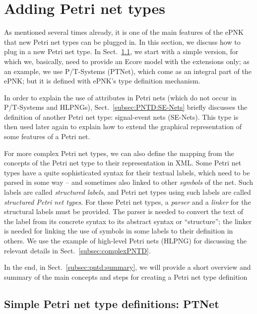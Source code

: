 \section{Adding Petri net types}  
\label{sec:adding-types}

As mentioned several times already, it is one of the main features of the ePNK
that new Petri net types can be plugged in. In this section, we discuss how to
plug in a new Petri net type.  In Sect.~\ref{subsec:simplePNTD}, we start with a
simple version, for which we, basically, need to provide an Ecore model with
the extensions only; as an example, we use P/T-Systems (PTNet), which come as an
integral part of the ePNK; but it is defined with ePNK's type definition
mechanism.

In order to explain the use of attributes in Petri nets (which do not occur
in P/T-Systems and HLPNGs), Sect.~\ref{subsec:PNTD:SE-Nets} briefly discusses
the definition of another Petri net type: signal-event nets (SE-Nets). This type is
then used later again to explain how to extend the graphical representation of
some features of a Petri net.

For more complex Petri net types, we can also define the mapping from the
concepts of the Petri net type to their representation in XML. Some Petri
net types have a quite sophisticated syntax for their textual labels,
which need to be parsed in some way -- and sometimes also linked to
other \emph{symbols} of the net. Such labels are called \emph{structured labels},
and Petri net types using such labels are called \emph{structured Petri net
types}. For these Petri net types, a \emph{parser} and a \emph{linker} for
the structural labels must be provided. The parser is needed to convert the
text of the label from its concrete syntax to its abstract
syntax or ``structure''; the linker is needed for linking the use of symbols in
some labels to their definition in others. We use the example of high-level Petri nets (HLPNG)
for discussing the relevant details in Sect.~\ref{subsec:complexPNTD}.

In the end, in Sect.~\ref{subsec:pntd:summary}, we will provide a short overview
and summary of the main concepts and steps for creating a Petri net type definition 
  
\subsection{Simple Petri net type definitions: PTNet}
\label{subsec:simplePNTD}

